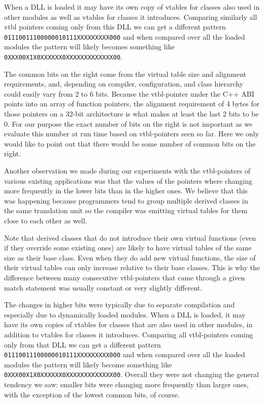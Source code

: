 When a DLL is loaded it may have its own copy of vtables for classes also used 
in other modules as well as vtables for classes it introduces. Comparing 
similarly all vtbl pointers coming only from this DLL we can get a different 
pattern \\ \texttt{01110011100000010111XXXXXXXXX000} and when compared over all 
the loaded modules the pattern will likely becomes something like 
\texttt{0XXX00X1X0XXXXXX0XXXXXXXXXXXXX00}.

The common bits on the right come from the virtual table size and alignment 
requirements, and, depending on compiler, configuration, and class hierarchy could 
easily vary from 2 to 6 bits. Because the vtbl-pointer under the C++ ABI points into 
an array of function pointers, the alignment requirement of 4 bytes for those 
pointers on a 32-bit architecture is what makes at least the last 2 bits to be 0. 
For our purpose the exact number of bits on the right is not important as we 
evaluate this number at run time based on vtbl-pointers seen so far. Here we only 
would like to point out that there would be some number of common bits on the 
right.

Another observation we made during our experiments with the vtbl-pointers of various 
existing applications was that the values of the pointers where changing more 
frequently in the lower bits than in the higher ones. We believe that this was 
happening because programmers tend to group multiple derived classes in the same 
translation unit so the compiler was emitting virtual tables for them close to 
each other as well. 

Note that derived classes that do not introduce their own virtual functions 
(even if they override some existing ones) are likely to have virtual tables of 
the same size as their base class. Even when they do add new virtual functions, 
the size of their virtual tables can only increase relative to their base 
classes. This is why the difference between many consecutive vtbl-pointers that 
came through a given match statement was usually constant or very slightly 
different.

The changes in higher bits were typically due to separate compilation and 
especially due to dynamically loaded modules. When a DLL is loaded, it may have 
its own copies of vtables for classes that are also used in other modules, in addition to 
vtables for classes it introduces. Comparing all vtbl-pointers coming only from 
that DLL we can get a different pattern \texttt{01110011100000010111XXXXXXXXX000} 
and when compared over all the loaded modules the pattern will likely become 
something like \texttt{0XXX00X1X0XXXXXX0XXXXXXXXXXXXX00}. Overall they were not 
changing the general tendency we saw: smaller bits were changing more frequently 
than larger ones, with the exception of the lowest common bits, of course.

